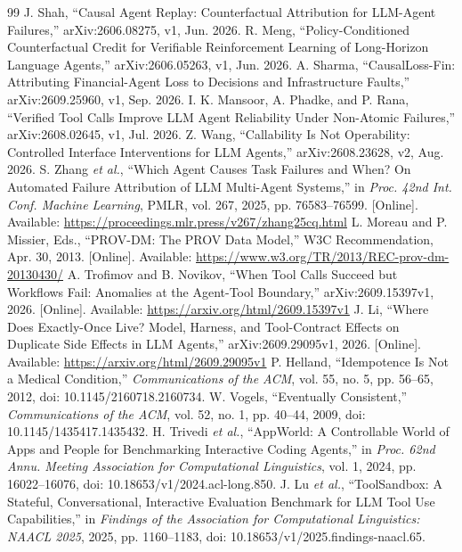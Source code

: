 \documentclass[conference]{IEEEtran}
\begin{document}
\balance
\begin{thebibliography}{99}
 J. Shah, ``Causal Agent Replay: Counterfactual Attribution for
LLM-Agent Failures,'' arXiv:2606.08275, v1, Jun. 2026.
 R. Meng, ``Policy-Conditioned Counterfactual Credit for Verifiable
Reinforcement Learning of Long-Horizon Language Agents,'' arXiv:2606.05263, v1,
Jun. 2026.
 A. Sharma, ``CausalLoss-Fin: Attributing Financial-Agent
Loss to Decisions and Infrastructure Faults,'' arXiv:2609.25960, v1, Sep. 2026.
 I. K. Mansoor, A. Phadke, and P. Rana, ``Verified Tool Calls
Improve LLM Agent Reliability Under Non-Atomic Failures,'' arXiv:2608.02645,
v1, Jul. 2026.
 Z. Wang, ``Callability Is Not Operability: Controlled
Interface Interventions for LLM Agents,'' arXiv:2608.23628, v2, Aug. 2026.
S. Zhang \emph{et al.}, ``Which Agent Causes Task Failures and When? On Automated Failure Attribution of LLM Multi-Agent Systems,'' in \emph{Proc. 42nd Int. Conf. Machine Learning}, PMLR, vol. 267, 2025, pp. 76583--76599. [Online]. Available: \url{https://proceedings.mlr.press/v267/zhang25cq.html}
L. Moreau and P. Missier, Eds., ``PROV-DM: The PROV Data Model,'' W3C Recommendation, Apr. 30, 2013. [Online]. Available: \url{https://www.w3.org/TR/2013/REC-prov-dm-20130430/}
A. Trofimov and B. Novikov, ``When Tool Calls Succeed but Workflows Fail: Anomalies at the Agent-Tool Boundary,'' arXiv:2609.15397v1, 2026. [Online]. Available: \url{https://arxiv.org/html/2609.15397v1}
J. Li, ``Where Does Exactly-Once Live? Model, Harness, and Tool-Contract Effects on Duplicate Side Effects in LLM Agents,'' arXiv:2609.29095v1, 2026. [Online]. Available: \url{https://arxiv.org/html/2609.29095v1}
P. Helland, ``Idempotence Is Not a Medical Condition,'' \emph{Communications of the ACM}, vol. 55, no. 5, pp. 56--65, 2012, doi: 10.1145/2160718.2160734.
W. Vogels, ``Eventually Consistent,'' \emph{Communications of the ACM}, vol. 52, no. 1, pp. 40--44, 2009, doi: 10.1145/1435417.1435432.
H. Trivedi \emph{et al.}, ``AppWorld: A Controllable World of Apps and People for Benchmarking Interactive Coding Agents,'' in \emph{Proc. 62nd Annu. Meeting Association for Computational Linguistics}, vol. 1, 2024, pp. 16022--16076, doi: 10.18653/v1/2024.acl-long.850.
J. Lu \emph{et al.}, ``ToolSandbox: A Stateful, Conversational, Interactive Evaluation Benchmark for LLM Tool Use Capabilities,'' in \emph{Findings of the Association for Computational Linguistics: NAACL 2025}, 2025, pp. 1160--1183, doi: 10.18653/v1/2025.findings-naacl.65.

\end{thebibliography}
\end{document}
